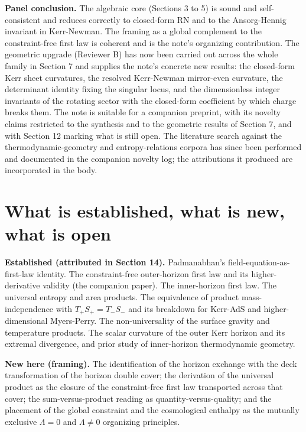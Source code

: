 \documentclass[11pt]{article}
\begin{document}
\textbf{Panel conclusion.} The algebraic core (Sections 3 to 5) is sound and self-consistent and reduces correctly to closed-form RN and to the Ansorg-Hennig invariant in Kerr-Newman. The framing as a global complement to the constraint-free first law is coherent and is the note's organizing contribution. The geometric upgrade (Reviewer B) has now been carried out across the whole family in Section 7 and supplies the note's concrete new results: the closed-form Kerr sheet curvatures, the resolved Kerr-Newman mirror-even curvature, the determinant identity fixing the singular locus, and the dimensionless integer invariants of the rotating sector with the closed-form coefficient by which charge breaks them. The note is suitable for a companion preprint, with its novelty claims restricted to the synthesis and to the geometric results of Section 7, and with Section 12 marking what is still open. The literature search against the thermodynamic-geometry and entropy-relations corpora has since been performed and documented in the companion novelty log; the attributions it produced are incorporated in the body.



\section{What is established, what is new, what is open}

\textbf{Established (attributed in Section 14).} Padmanabhan's field-equation-as-first-law identity. The constraint-free outer-horizon first law and its higher-derivative validity (the companion paper). The inner-horizon first law. The universal entropy and area products. The equivalence of product mass-independence with $T_+S_+ = T_-S_-$ and its breakdown for Kerr-AdS and higher-dimensional Myers-Perry. The non-universality of the surface gravity and temperature products. The scalar curvature of the outer Kerr horizon and its extremal divergence, and prior study of inner-horizon thermodynamic geometry.

\textbf{New here (framing).} The identification of the horizon exchange with the deck transformation of the horizon double cover; the derivation of the universal product as the closure of the constraint-free first law transported across that cover; the sum-versus-product reading as quantity-versus-quality; and the placement of the global constraint and the cosmological enthalpy as the mutually exclusive $\Lambda = 0$ and $\Lambda \ne 0$ organizing principles.
\end{document}
